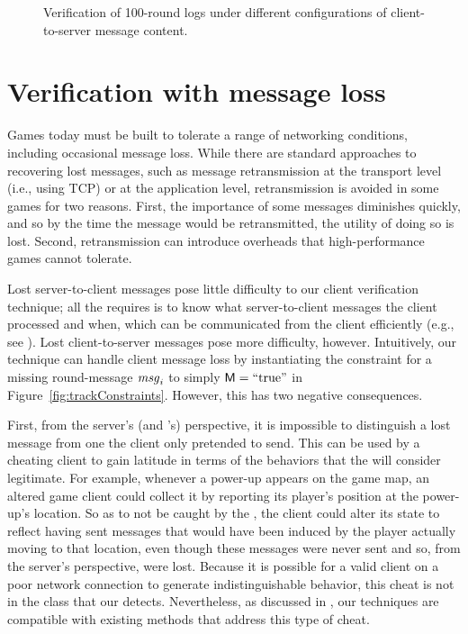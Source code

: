 \begin{figure}[t]
\caption{Verification of 100-round \tetrinet logs under different
configurations of client-to-server message content.}
\label{fig:tetrinettimes}
\end{figure}

\section{Verification with message loss}
\label{sec:scv:message-loss}

Games today must be built to tolerate a range of networking
conditions, including occasional message loss.  While there are
standard approaches to recovering lost messages, such as message
retransmission at the transport level (i.e., using TCP) or at the
application level, retransmission is avoided in some games for two
reasons.  First, the importance of some messages diminishes quickly,
and so by the time the message would be retransmitted, the utility of
doing so is lost.  Second, retransmission can introduce overheads that
high-performance games cannot tolerate.


Lost server-to-client messages pose little difficulty to our client
verification technique; all the \verifier requires is to know what
server-to-client messages the client processed and when, which can be
communicated from the client efficiently (e.g., see
).  Lost client-to-server messages pose more
difficulty, however.  Intuitively, our technique can handle client
message loss by instantiating the constraint \msgConstraint for a
missing round-\roundidx message $\mathit{msg}_{i}$ to simply
$\mathsf M\space = ``\mathrm{true}"$ in
Figure~\ref{fig:trackConstraints}.  However, this has two negative
consequences.

First, from the server's (and \verifier's) perspective, it is
impossible to distinguish a lost message from one the client only
pretended to send.  This can be used by a cheating client to gain
latitude in terms of the behaviors that the \verifier will consider
legitimate.  For example, whenever a power-up appears on the game map,
an altered game client could collect it by reporting its player's
position at the power-up's location.  So as to not be caught by the
\verifier, the client could alter its state to reflect having sent
messages that would have been induced by the player actually moving to
that location, even though these messages were never sent and so, from
the server's perspective, were lost. Because it is possible for a
valid client on a poor network connection to generate
indistinguishable behavior, this cheat is not in the class that our
\verifier detects. Nevertheless, as discussed in
,
our techniques are compatible with existing methods that address this
type of cheat.

